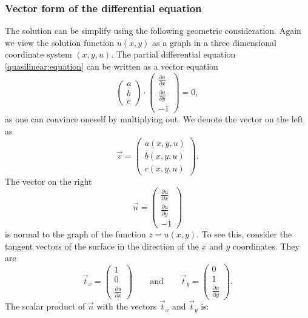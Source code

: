 \subsubsection{Vector form of the differential equation}
The solution can be simplify using the following geometric consideration.
Again we view the solution function $u(x,y)$ as a graph in a three dimensional
coordinate system $(x,y,u)$.
The partial differential equation \eqref{quasilinear:equation}
can be written as a vector equation
\begin{equation}
\begin{pmatrix}a\\b\\c\end{pmatrix}
\cdot
\begin{pmatrix}
\frac{\partial u}{\partial x}\\
\frac{\partial u}{\partial y}\\
-1
\end{pmatrix}
=0,
\label{quasilinear:vektorform}
\end{equation}
as one can convince oneself by multiplying out.
We denote the vector on the left as
\[
\vec v=\begin{pmatrix}
a(x,y,u)\\
b(x,y,u)\\
c(x,y,u)
\end{pmatrix}.
\]
The vector on the right
\[
\vec n=
\begin{pmatrix}
\frac{\partial u}{\partial x}\\
\frac{\partial u}{\partial y}\\
-1
\end{pmatrix}
\]
is normal to the graph of the function $z=u(x,y)$.
To see this, consider the tangent vectors of the surface in the
direction of the $x$ and $y$ coordinates.
They are
\[
\vec t_x
=
\begin{pmatrix}1\\0\\\frac{\partial u}{\partial x}\end{pmatrix}
\qquad
\text{and}
\qquad
\vec t_y
=
\begin{pmatrix}0\\1\\\frac{\partial u}{\partial y}\end{pmatrix}.
\]
The scalar product of $\vec n$ with the vectors $\vec{t}_x$ and $\vec{t}_y$
is:
